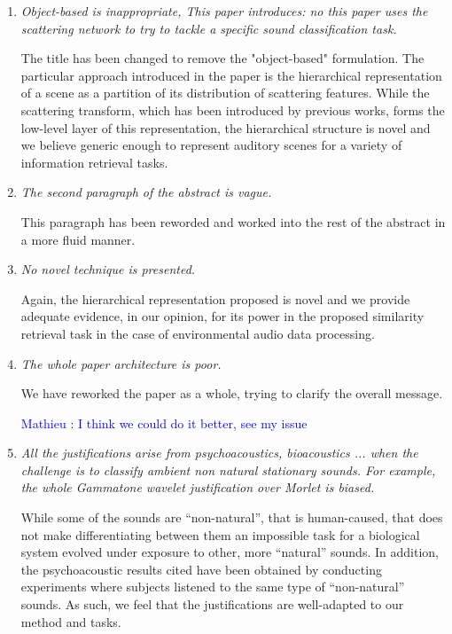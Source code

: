 \documentclass[10pt]{article}
\newcommand{\ml}[1]{\textcolor{blue}{ Mathieu : #1}}
\begin{document}
\begin{enumerate}

\item \emph{Object-based is inappropriate, This paper introduces: no this paper uses the scattering network to try to tackle a specific sound classification task.}

The title has been changed to remove the "object-based" formulation. The particular approach introduced in the paper is the hierarchical representation of a scene as a partition of its distribution of scattering features. While the scattering transform, which has been introduced by previous works, forms the low-level layer of this representation, the hierarchical structure is novel and we believe generic enough to represent auditory scenes for a variety of information retrieval tasks.

\item \emph{The second paragraph of the abstract is vague.}

This paragraph has been reworded and worked into the rest of the abstract in a more fluid manner.

\item \emph{No novel technique is presented.}

Again, the hierarchical representation proposed is novel and we provide adequate evidence, in our opinion, for its power in the proposed similarity retrieval task in the case of environmental audio data processing.

\item \emph{The whole paper architecture is poor.}

We have reworked the paper as a whole, trying to clarify the overall message.

\ml{I think we could do it better, see my issue}

\item \emph{All the justifications arise from psychoacoustics, bioacoustics ... when the challenge is to classify ambient non natural stationary sounds. For example, the whole Gammatone wavelet justification over Morlet is biased.}

While some of the sounds are ``non-natural'', that is human-caused, that does not make differentiating between them an impossible task for a biological system evolved under exposure to other, more ``natural'' sounds. In addition, the psychoacoustic results cited have been obtained by conducting experiments where subjects listened to the same type of ``non-natural'' sounds. As such, we feel that the justifications are well-adapted to our method and tasks.


\end{enumerate}
\end{document}
